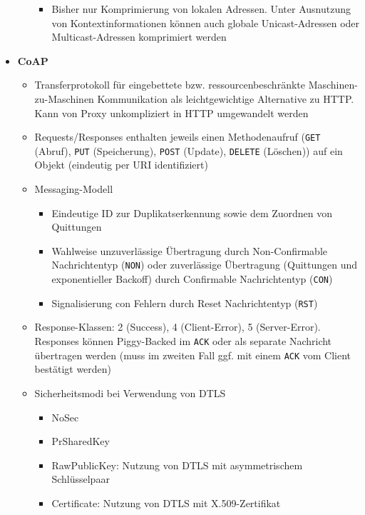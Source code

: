 \begin{itemize}
\begin{itemize}
\begin{itemize}
			\item Bisher nur Komprimierung von lokalen Adressen. Unter Ausnutzung von Kontextinformationen können auch globale Unicast-Adressen oder Multicast-Adressen komprimiert werden
		\end{itemize}
	\end{itemize}
	\item \textbf{CoAP}
	\begin{itemize}
		\item Transferprotokoll für eingebettete bzw. ressourcenbeschränkte Maschinen-zu-Maschinen Kommunikation als leichtgewichtige Alternative zu HTTP. Kann von Proxy unkompliziert in HTTP umgewandelt werden
		\item Requests/Responses enthalten jeweils einen Methodenaufruf (\texttt{GET} (Abruf), \texttt{PUT} (Speicherung), \texttt{POST} (Update), \texttt{DELETE} (Löschen)) auf ein Objekt (eindeutig per URI identifiziert)
		\item Messaging-Modell
		\begin{itemize}
			\item Eindeutige ID zur Duplikatserkennung sowie dem Zuordnen von Quittungen
			\item Wahlweise unzuverlässige Übertragung durch Non-Confirmable Nachrichtentyp (\texttt{NON}) oder zuverlässige Übertragung (Quittungen und exponentieller Backoff) durch Confirmable Nachrichtentyp (\texttt{CON})
			\item Signalisierung con Fehlern durch Reset Nachrichtentyp (\texttt{RST})
		\end{itemize}
		\item Response-Klassen: 2 (Success), 4 (Client-Error), 5 (Server-Error). Responses können Piggy-Backed im \texttt{ACK} oder als separate Nachricht übertragen werden (muss im zweiten Fall ggf. mit einem \texttt{ACK} vom Client bestätigt werden)
		\item Sicherheitsmodi bei Verwendung von DTLS
		\begin{itemize}
			\item NoSec
			\item PrSharedKey
			\item RawPublicKey: Nutzung von DTLS mit asymmetrischem Schlüsselpaar
			\item Certificate: Nutzung von DTLS mit X.509-Zertifikat
		\end{itemize}
	\end{itemize}
\end{itemize}

